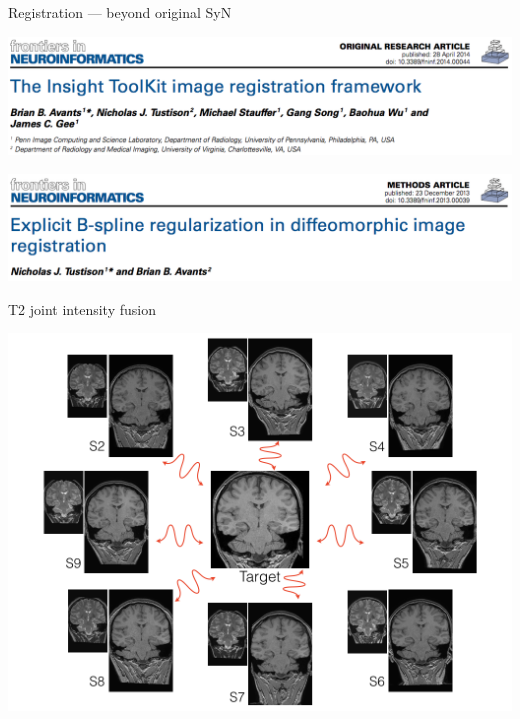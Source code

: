 \documentclass[ignorenonframetext,]{beamer}
\begin{document}
\begin{frame}{Registration --- beyond original SyN}

\centering
\includegraphics[width=0.85 \textwidth]{../Figures/Frontiers_ITK.png}

\vspace{2mm}

\centering
\includegraphics[width=0.85 \textwidth]{../Figures/Frontiers_BSplineSyN.png}

\end{frame}

\begin{frame}{T2 joint intensity fusion}

\centering
\includegraphics[width=0.85 \textwidth]{../Figures/jifNormalization.png}

\end{frame}
\end{document}
